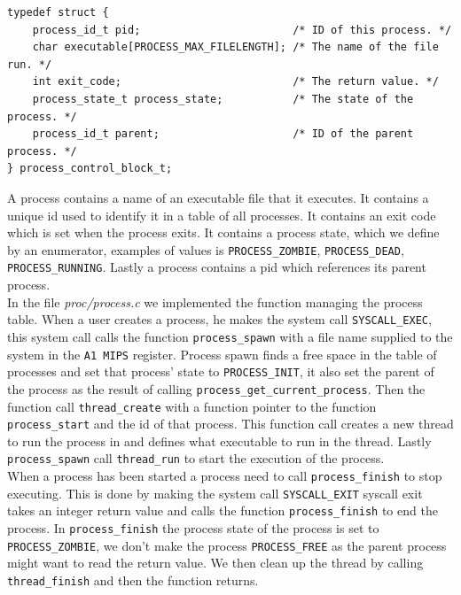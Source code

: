 \documentclass[11pt]{article}
\begin{document}
    \begin{lstlisting}[style=customc]
typedef struct {
    process_id_t pid;                        /* ID of this process. */
    char executable[PROCESS_MAX_FILELENGTH]; /* The name of the file run. */
    int exit_code;                           /* The return value. */
    process_state_t process_state;           /* The state of the process. */
    process_id_t parent;                     /* ID of the parent process. */
} process_control_block_t;
    \end{lstlisting}

    A process contains a name of an executable file that it executes.  It
    contains a unique id used to identify it in a table of all processes.  It
    contains an exit code which is set when the process exits. It contains a
    process state, which we define by an enumerator, examples of values is
    \texttt{PROCESS\_ZOMBIE}, \texttt{PROCESS\_DEAD}, \texttt{PROCESS\_RUNNING}.
    Lastly a process contains a pid which references its parent process. \\

    In the file \textit{proc/process.c} we implemented the function managing the
    process table.  When a user creates a process, he makes the system call
    \texttt{SYSCALL\_EXEC}, this system call calls the function
    \texttt{process\_spawn} with a file name supplied to the system in the
    \texttt{A1 MIPS} register.  Process spawn finds a free space in the table of
    processes and set that process' state to \texttt{PROCESS\_INIT}, it also set
    the parent of the process as the result of calling
    \texttt{process\_get\_current\_process}.  Then the function call
    \texttt{thread\_create} with a function pointer to the function
    \texttt{process\_start} and the id of that process.  This function call
    creates a new thread to run the process in and defines what executable to
    run in the thread.  Lastly \texttt{process\_spawn} call \texttt{thread\_run}
    to start the execution of the process. \\

    When a process has been started a process need to call
    \texttt{process\_finish} to stop executing.  This is done by making the
    system call \texttt{SYSCALL\_EXIT} syscall exit takes an integer return
    value and calls the function \texttt{process\_finish} to end the process. In
    \texttt{process\_finish} the process state of the process is set to
    \texttt{PROCESS\_ZOMBIE}, we don't make the process \texttt{PROCESS\_FREE}
    as the parent process might want to read the return value.  We then clean up
    the thread by calling \texttt{thread\_finish} and then the function
    returns. \\
\end{document}
